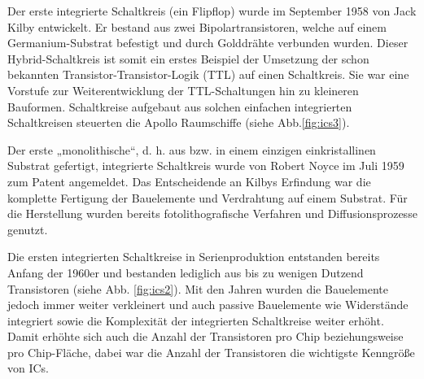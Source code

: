 Der erste integrierte Schaltkreis (ein Flipflop) wurde im September 1958 von Jack Kilby entwickelt.
Er bestand aus zwei Bipolartransistoren, welche auf einem Germanium-Substrat befestigt und durch 
Golddrähte verbunden wurden. Dieser Hybrid-Schaltkreis ist somit ein erstes Beispiel der Umsetzung 
der schon bekannten Transistor-Transistor-Logik (TTL) auf einen Schaltkreis. Sie war eine Vorstufe 
zur Weiterentwicklung der TTL-Schaltungen hin zu kleineren Bauformen. Schaltkreise aufgebaut aus 
solchen einfachen integrierten Schaltkreisen steuerten die Apollo Raumschiffe (siehe Abb.\ref{fig:ics3}).

Der erste „monolithische“, d. h. aus bzw. in einem einzigen einkristallinen Substrat gefertigt, 
integrierte Schaltkreis wurde von Robert Noyce im Juli 1959 zum Patent angemeldet. Das 
Entscheidende an Kilbys Erfindung war die komplette Fertigung der Bauelemente und 
Verdrahtung auf einem Substrat. Für die Herstellung wurden bereits fotolithografische 
Verfahren und Diffusionsprozesse genutzt. 

Die ersten integrierten Schaltkreise in Serienproduktion entstanden bereits Anfang der 1960er  
und bestanden lediglich aus bis zu wenigen Dutzend Transistoren (siehe Abb. \ref{fig:ics2}). Mit den Jahren wurden die
Bauelemente jedoch immer weiter verkleinert und auch passive Bauelemente wie Widerstände 
integriert sowie die Komplexität der integrierten Schaltkreise weiter erhöht. Damit erhöhte sich 
auch die Anzahl der Transistoren pro Chip beziehungsweise pro Chip-Fläche, dabei war die 
Anzahl der Transistoren die wichtigste Kenngröße von ICs.

